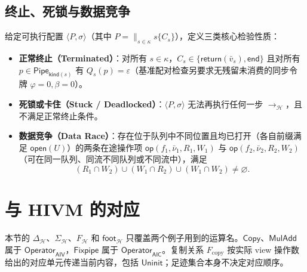 \documentclass[UTF8,a4paper,11pt,fontset=fandol]{ctexart}
\newcommand{\kw}[1]{\ensuremath{\mathsf{#1}}}
\begin{document}
\subsection{终止、死锁与数据竞争}

给定可执行配置 $\langle P,\sigma\rangle$（其中 $P=\parallel_{s\in\kappa}s\{C_s\}$），定义三类核心检验性质：
\begin{itemize}
\item \textbf{正常终止（Terminated）}：对所有 $s\in\kappa$，$C_s\in\{\kw{return}(\bar v_s),\kw{end}\}$ 且对所有 $p\in\mathsf{Pipe}_{\mathsf{kind}(s)}$ 有 $Q_s(p)=\varepsilon$（基准配对检查另要求无残留未消费的同步令牌 $\varphi=0,\beta=0$）。
\item \textbf{死锁或卡住（Stuck / Deadlocked）}：$\langle P,\sigma\rangle$ 无法再执行任何一步 $\longrightarrow_{\mathcal H}$，且不满足正常终止条件。
\item \textbf{数据竞争（Data Race）}：存在位于队列中不同位置且均已打开（各自前缀满足 $\mathsf{open}(U)$）的两条在途操作项 $\kw{op}(f_1,\bar\nu_1,R_1,W_1)$ 与 $\kw{op}(f_2,\bar\nu_2,R_2,W_2)$（可在同一队列、同流不同队列或不同流中），满足
\[
(R_1\cap W_2)\cup(W_1\cap R_2)\cup(W_1\cap W_2)\ne\varnothing.
\]
\end{itemize}
\clearpage

\section{与 HIVM 的对应}

本节的 $\Delta_{\mathcal H}$、$\Sigma_{\mathcal H}$、$F_{\mathcal H}$ 和 $\mathsf{foot}_{\mathcal H}$ 只覆盖两个例子用到的运算名。$\kw{Copy}$、$\kw{MulAdd}$ 属于 $\mathsf{Operator}_{\mathsf{AIV}}$，$\kw{Fixpipe}$ 属于 $\mathsf{Operator}_{\mathsf{AIC}}$。复制关系 $F_{\mathrm{copy}}$ 按实际 view 操作数给出的对应单元传递当前内容，包括 $\mathsf{Uninit}$；足迹集合本身不决定对应顺序。
\end{document}
